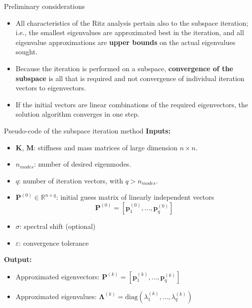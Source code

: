 \documentclass[aspectratio=169]{beamer}
\begin{document}
\begin{frame}{Preliminary considerations}
  \begin{itemize}
    \item  All characteristics of the Ritz analysis pertain also to the subspace iteration; i.e., the smallest eigenvalues are approximated best in the iteration, and all eigenvalue approximations are \textbf{upper bounds} on the actual eigenvalues sought.
    \item Because the iteration is performed on a subspace, \textbf{convergence of the subspace} is all that is required and not convergence of individual iteration vectors to eigenvectors.
    \item If the initial vectors are linear combinations of the required eigenvectors, the solution algorithm converges in one step.
  \end{itemize}
\end{frame}

\begin{frame}{Pseudo-code of the subspace iteration method}
  \small
  \textbf{Inputs:}
  \begin{itemize}
    \item \(\mathbf K \), \(\mathbf M \): stiffness and mass matrices of large  dimension \( n \times n \).
    \item \( n_{modes} \): number of desired eigenmodes.
    \item \( q \): number of iteration vectors, with \( q > n_{modes} \).
    \item \(\mathbf P^{(0)} \in \mathbb{R}^{n \times q} \): initial guess matrix of linearly independent vectors
          $$\mathbf  P^{(0)}=[\mathbf p^{(0)}_1,\dots,\mathbf p^{(0)}_q]$$
    \item \( \sigma \): spectral shift (optional)
    \item \( \varepsilon \): convergence tolerance
  \end{itemize}

  \textbf{Output:}
  \begin{itemize}
    \item  Approximated eigenvectors: $\mathbf  P^{(k)}=[\mathbf p^{(k)}_1,\dots,\mathbf p^{(k)}_q]$
    \item Approximated eigenvalues: $\mathbf \Lambda^{(k)}=\text{diag}(\lambda^{(k)}_1,\dots,\lambda^{(k)}_q)$
  \end{itemize}
\end{frame}
\end{document}
